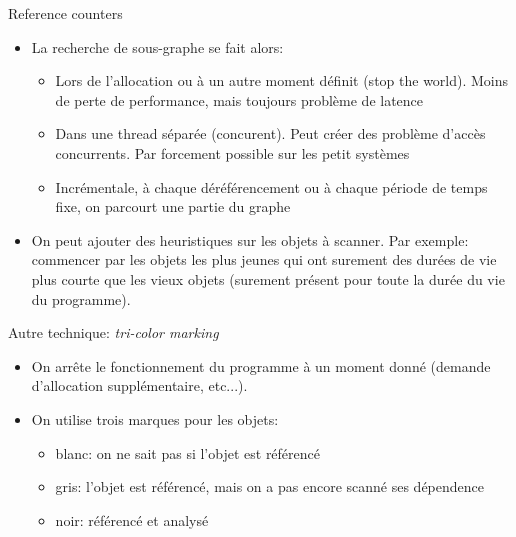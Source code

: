 \begin{frame}[fragile=singleslide]{Reference counters}
  \begin{itemize}
  \item La recherche de sous-graphe se fait alors:
    \begin{itemize}
    \item Lors de l'allocation ou  à un autre moment définit (stop the
      world). Moins de perte de performance, mais toujours problème de
      latence
    \item  Dans  une  thread  séparée  (concurent).   Peut  créer  des
      problème  d'accès concurrents.  Par  forcement possible  sur les
      petit systèmes
    \item Incrémentale,  à chaque déréférencement ou  à chaque période
      de temps fixe, on parcourt une partie du graphe
    \end{itemize}
  \item On peut ajouter des heuristiques sur les objets à scanner. Par
    exemple: commencer par les objets les plus jeunes qui ont surement
    des  durées de  vie plus  courte  que les  vieux objets  (surement
    présent pour toute la durée du vie du programme).
  \end{itemize}
\end{frame}

\begin{frame}[fragile=singleslide]{Autre technique: \emph{tri-color marking}}
  \begin{itemize}
  \item On  arrête le  fonctionnement du programme  à un  moment donné
    (demande d'allocation supplémentaire, etc...).
  \item On utilise trois marques pour les objets:
    \begin{itemize}
    \item blanc: on ne sait pas si l'objet est référencé
    \item gris: l'objet est référencé, mais on a pas encore scanné ses
      dépendence
    \item noir: référencé et analysé
    \end{itemize}
  \end{itemize}
\end{frame}  


